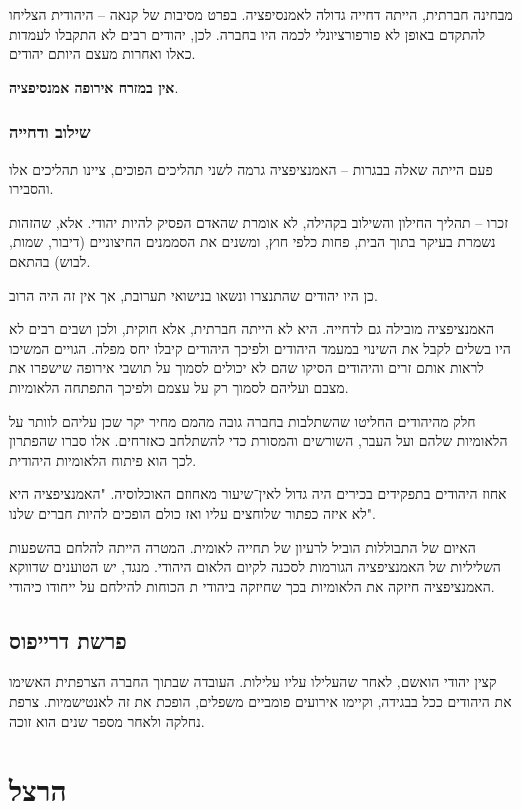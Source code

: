 \documentclass[a4paper]{book}
\begin{document}
	מבחינה חברתית, הייתה דחייה גדולה לאמנסיפציה. בפרט מסיבות של קנאה – היהודית הצליחו להתקדם באופן לא פורפורציונלי לכמה היו בחברה. לכן, יהודים רבים לא התקבלו לעמדות כאלו ואחרות מעצם היותם יהודים. 
	
	\textbf{אין במזרח אירופה אמנסיפציה}.
	
	
	\subsubsection{שילוב ודחייה}
	פעם הייתה שאלה בבגרות – האמנציפציה גרמה לשני תהליכים הפוכים, ציינו תהליכים אלו והסבירו. 
	
	זכרו – תהליך החילון והשילוב בקהילה, לא אומרת שהאדם הפסיק להיות יהודי. אלא, שהזהות נשמרת בעיקר בתוך הבית, פחות כלפי חוץ, ומשנים את הסממנים החיצוניים (דיבור, שמות, לבוש) בהתאם. 
	
	כן היו יהודים שהתנצרו ונשאו בנישואי תערובת, אך אין זה היה הרוב. 
	
	האמנציפציה מובילה גם לדחייה. היא לא הייתה חברתית, אלא חוקית, ולכן ושבים רבים לא היו בשלים לקבל את השינוי במעמד היהודים ולפיכך היהודים קיבלו יחס מפלה. הגויים המשיכו לראות אותם זרים והיהודים הסיקו שהם לא יכולים לסמוך על תושבי אירופה שישפרו את מצבם ועליהם לסמוך רק על עצמם ולפיכך התפתחה הלאומיות. 
	
	חלק מהיהודים החליטו שהשתלבות בחברה גובה מהמם מחיר יקר שכן עליהם לוותר על הלאומיות שלהם ועל העבר, השורשים והמסורת כדי להשתלחב כאזרחים. אלו סברו שהפתרון לכך הוא פיתוח הלאומיות היהודית. 
	
	אחוז היהודים בתפקידים בכירים היה גדול לאין־שיעור מאחוזם האוכלוסיה. "האמנציפציה היא לא איזה כפתור שלוחצים עליו ואז כולם הופכים להיות חברים שלנו". 
	
	האיום של התבוללות הוביל לרעיון של תחייה לאומית. המטרה הייתה להלחם בהשפעות השליליות של האמנציפציה הגורמות לסכנה לקיום הלאום היהודי. מנגד, יש הטוענים שדווקא האמנציפציה חיזקה את הלאומיות בכך שחיזקה ביהודי ת הכוחות להילחם על ייחודו כיהודי. 
	
	\subsection{פרשת דרייפוס}
	קצין יהודי הואשם, לאחר שהעלילו עליו עלילות. העובדה שבתוך החברה הצרפתית האשימו את היהודים ככל בבגידה, וקיימו אירועים פומביים משפלים, הופכת את זה לאנטישמיות. צרפת נחלקה ולאחר מספר שנים הוא זוכה. 
	
	
	\section{הרצל}
	
\end{document}
